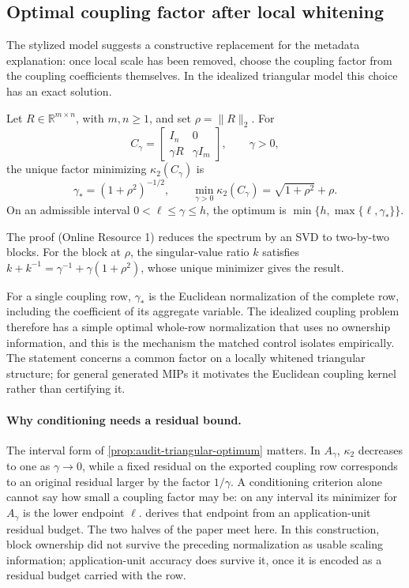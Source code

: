 \subsection{Optimal coupling factor after local whitening}

The stylized model suggests a constructive replacement for the metadata explanation: once
local scale has been removed, choose the coupling factor from the coupling coefficients
themselves. In the idealized triangular model this choice has an exact solution.

\begin{proposition}
\label{prop:audit-triangular-optimum}
Let $R\in\mathbb R^{m\times n}$, with $m,n\geq1$, and set $\rho=\|R\|_2$. For
\[
 C_\gamma=\begin{bmatrix}I_n&0\\\gamma R&\gamma I_m\end{bmatrix},
 \qquad\gamma>0,
\]
the unique factor minimizing $\kappa_2(C_\gamma)$ is
\[
 \gamma_*=(1+\rho^2)^{-1/2},
 \qquad
 \min_{\gamma>0}\kappa_2(C_\gamma)=\sqrt{1+\rho^2}+\rho.
\]
On an admissible interval $0<\ell\leq\gamma\leq h$, the optimum is
$\min\{h,\max\{\ell,\gamma_*\}\}$.
\end{proposition}
The proof (Online Resource 1) reduces the spectrum by an SVD to two-by-two blocks. For the
block at $\rho$, the singular-value ratio $k$ satisfies
$k+k^{-1}=\gamma^{-1}+\gamma(1+\rho^2)$, whose unique minimizer gives the result.

For a single coupling row, $\gamma_*$ is the Euclidean normalization of the complete row,
including the coefficient of its aggregate variable. The idealized coupling problem
therefore has a simple optimal whole-row normalization that uses no ownership information,
and this is the mechanism the matched control isolates empirically. The statement concerns a
common factor on a locally whitened triangular structure; for general generated MIPs it
motivates the Euclidean coupling kernel rather than certifying it.

\paragraph{Why conditioning needs a residual bound.}
The interval form of \cref{prop:audit-triangular-optimum} matters. In $A_\gamma$,
$\kappa_2$ decreases to one as $\gamma\to0$, while a fixed residual on the exported coupling
row corresponds to an original residual larger by the factor $1/\gamma$. A conditioning
criterion alone cannot say how small a coupling factor may be: on any interval its
minimizer for $A_\gamma$ is the lower endpoint $\ell$.  derives that
endpoint from an application-unit residual budget. The two halves of the paper meet here.
In this construction, block ownership did not survive the preceding normalization as usable
scaling information;
application-unit accuracy does survive it, once it is encoded as a residual budget carried
with the row.

